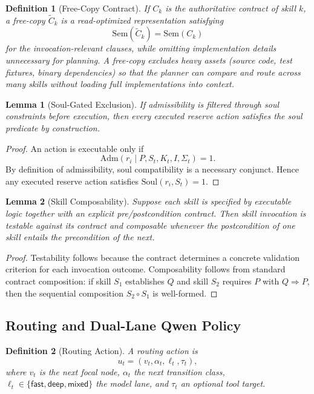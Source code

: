 \documentclass[11pt]{article}
\newtheorem{definition}{Definition}[section]
\newtheorem{lemma}{Lemma}[section]
\theoremstyle{remark}
\newcommand{\fast}{\mathsf{fast}}
\newcommand{\deep}{\mathsf{deep}}
\newcommand{\mixed}{\mathsf{mixed}}
\newcommand{\Adm}{\mathrm{Adm}}
\newcommand{\Soul}{\mathrm{Soul}}
\begin{document}
\begin{definition}[Free-Copy Contract]
If \(C_k\) is the authoritative contract of skill \(k\), a free-copy \(\widetilde{C}_k\) is a read-optimized representation satisfying
\[
\mathrm{Sem}(\widetilde{C}_k)=\mathrm{Sem}(C_k)
\]
for the invocation-relevant clauses, while omitting implementation details unnecessary for planning.
A free-copy excludes heavy assets (source code, test fixtures, binary dependencies) so that the planner can compare and route across many skills without loading full implementations into context.
\end{definition}

\begin{lemma}[Soul-Gated Exclusion]
If admissibility is filtered through soul constraints before execution, then every executed reserve action satisfies the soul predicate by construction.
\end{lemma}

\begin{proof}
An action is executable only if
\[
\Adm(r_i \mid P,S_t,K_t,I,\Sigma_t)=1.
\]
By definition of admissibility, soul compatibility is a necessary conjunct. Hence any executed reserve action satisfies \(\Soul(r_i,S_t)=1\).
\end{proof}

\begin{lemma}[Skill Composability]
Suppose each skill is specified by executable logic together with an explicit pre/postcondition contract. Then skill invocation is testable against its contract and composable whenever the postcondition of one skill entails the precondition of the next.
\end{lemma}

\begin{proof}
Testability follows because the contract determines a concrete validation criterion for each invocation outcome. Composability follows from standard contract composition: if skill \(S_1\) establishes \(Q\) and skill \(S_2\) requires \(P\) with \(Q \Rightarrow P\), then the sequential composition \(S_2 \circ S_1\) is well-formed.
\end{proof}

\subsection{Routing and Dual-Lane Qwen Policy}\label{sec:routing-policy}

\begin{definition}[Routing Action]
A routing action is
\[
u_t=(v_t,\alpha_t,\ell_t,\tau_t),
\]
where \(v_t\) is the next focal node, \(\alpha_t\) the next transition class, \(\ell_t\in\{\fast,\deep,\mixed\}\) the model lane, and \(\tau_t\) an optional tool target.
\end{definition}
\end{document}
